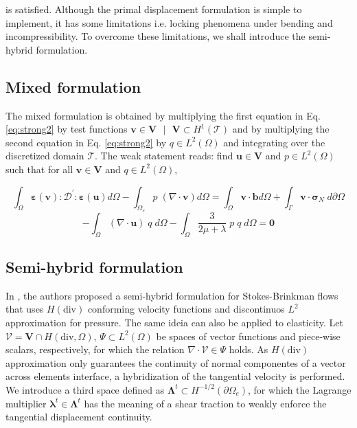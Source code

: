\documentclass{wccm2024}
\begin{document}
\noindent is satisfied. Although the primal displacement formulation is simple to implement, it has some limitations i.e. locking phenomena under bending and incompressibility. To overcome these limitations, we shall introduce the semi-hybrid formulation.

\subsection{Mixed formulation}
The mixed formulation is obtained by multiplying the first equation in Eq. \eqref{eq:strong2} by test functions $\mathbf{v} \in \mathbf{V}\text{ } | \text{ }\mathbf{V} \subset H^1(\mathcal{T})$ and by multiplying the second equation in Eq. \eqref{eq:strong2} by $q\in L^2(\Omega)$ and integrating over the discretized domain $\mathcal{T}$. The weak statement reads: find $\mathbf{u} \in \mathbf{V}$ and $p\in L^2(\Omega)$ such that for all $\mathbf{v} \in \mathbf{V}$ and $q\in L^2(\Omega)$,

\begin{equation} \label{eq:mixedA}
        \int_{\Omega} \boldsymbol{\varepsilon}(\mathbf{v}) : \mathcal{D}^{'} : \boldsymbol{\varepsilon}(\mathbf{u}) d\Omega - \int_{\Omega_e} p \;(\nabla \cdot \mathbf{v}) d\Omega =  \int_{\Omega} \mathbf{v} \cdot \mathbf{b} d\Omega + \int_{\Gamma} \mathbf{v} \cdot \boldsymbol{\sigma}_N \;d\partial\Omega
\end{equation}
\begin{equation} \label{eq:mixedB}
    -\int_{\Omega} (\nabla \cdot \mathbf{u}) \;q\; d\Omega -\int_{\Omega} \frac{3}{2\mu+\lambda}\;p \;q\; d\Omega = \mathbf{0}
\end{equation}

\subsection{Semi-hybrid formulation}

In \cite{carvalho2024semi}, the authors proposed a semi-hybrid formulation for Stokes-Brinkman flows that uses $H(\text{div})$ conforming velocity functions and discontinuos $L^2$ approximation for pressure. The same ideia can also be applied to elasticity. Let $\mathcal{V} = \mathbf{V}\cap H(\text{div},\Omega)$, $\Psi \subset L^2(\Omega)$ be spaces of vector functions and piece-wise scalars, respectively, for which the relation $\nabla \cdot \mathcal{V} \in \Psi$ holds. As $H(\text{div})$ approximation only guarantees the continuity of normal componentes of a vector across elements interface, a hybridization of the tangential velocity is performed. We introduce a third space defined as $\boldsymbol{\Lambda}^t \subset H^{-1/2}(\partial\Omega_e)$, for which the Lagrange multiplier $\boldsymbol{\lambda}^t \in \boldsymbol{\Lambda}^t$ has the meaning of a shear traction to weakly enforce the tangential displacement continuity. 
\end{document}
